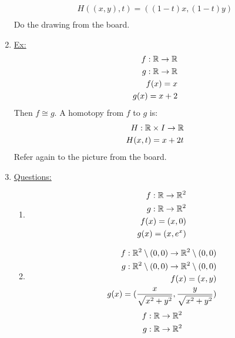 \begin{enumerate}
\begin{align*}
                H((x,y),t)=((1-t)x,(1-t)y)\\
            \end{align*}
            Do the drawing from the board.
        \item \underline{Ex:}
            \begin{align*}
                f:\mathbb{R} \rightarrow \mathbb{R}\\
                g:\mathbb{R} \rightarrow \mathbb{R}\\
                f(x)=x\\
                g(x)=x+2\\
            \end{align*}
            Then $f\cong g$. A homotopy from $f$ to $g$ is:
            \begin{align*}
                H:\mathbb{R} \times I \rightarrow \mathbb{R}\\
                H(x,t)=x+2t\\
            \end{align*}
            Refer again to the picture from the board.
        \item \underline{Questions:}
            \begin{enumerate}
                \item
                    \begin{align*}
                        f: \mathbb{R} \rightarrow \mathbb{R}^2\\
                        g: \mathbb{R} \rightarrow \mathbb{R}^2\\
                        f(x)=(x,0)\\
                        g(x)=(x,e^x)\\
                    \end{align*}
                \item
                    \begin{align*}
                        f: \mathbb{R}^2\setminus{(0,0)} \rightarrow \mathbb{R}^2\setminus{(0,0)}\\
                        g: \mathbb{R}^2\setminus{(0,0)} \rightarrow \mathbb{R}^2\setminus{(0,0)}\\
                        f(x)=(x,y)\\
                        g(x)=(\frac{x}{\sqrt{x^2+y^2}},\frac{y}{\sqrt{x^2+y^2}})\\
                    \end{align*}
                    \begin{align*}
                        f: \R \rightarrow \R^2\\
                        g: \R \rightarrow \R^2\\

\end{align*}
\end{enumerate}
\end{enumerate}
